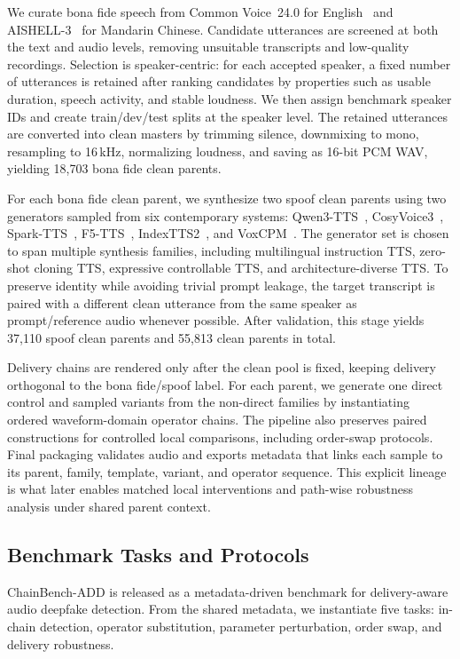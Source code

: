 We curate bona fide speech from Common Voice~24.0 for English~\cite{ardila2020commonvoicemassivelymultilingualspeech} and AISHELL-3~\cite{shi2020aishell} for Mandarin Chinese. Candidate utterances are screened at both the text and audio levels, removing unsuitable transcripts and low-quality recordings. Selection is speaker-centric: for each accepted speaker, a fixed number of utterances is retained after ranking candidates by properties such as usable duration, speech activity, and stable loudness. We then assign benchmark speaker IDs and create train/dev/test splits at the speaker level. The retained utterances are converted into clean masters by trimming silence, downmixing to mono, resampling to 16\,kHz, normalizing loudness, and saving as 16-bit PCM WAV, yielding 18,703 bona fide clean parents.

For each bona fide clean parent, we synthesize two spoof clean parents using two generators sampled from six contemporary systems: Qwen3-TTS~\cite{Qwen3-TTS}, CosyVoice3~\cite{du2025cosyvoice3}, Spark-TTS~\cite{wang2025sparktts}, F5-TTS~\cite{chen-etal-2024-f5tts}, IndexTTS2~\cite{zhou2025indextts2}, and VoxCPM~\cite{voxcpm2025}. The generator set is chosen to span multiple synthesis families, including multilingual instruction TTS, zero-shot cloning TTS, expressive controllable TTS, and architecture-diverse TTS. To preserve identity while avoiding trivial prompt leakage, the target transcript is paired with a different clean utterance from the same speaker as prompt/reference audio whenever possible. After validation, this stage yields 37,110 spoof clean parents and 55,813 clean parents in total.

Delivery chains are rendered only after the clean pool is fixed, keeping delivery orthogonal to the bona fide/spoof label. For each parent, we generate one direct control and sampled variants from the non-direct families by instantiating ordered waveform-domain operator chains. The pipeline also preserves paired constructions for controlled local comparisons, including order-swap protocols. Final packaging validates audio and exports metadata that links each sample to its parent, family, template, variant, and operator sequence. This explicit lineage is what later enables matched local interventions and path-wise robustness analysis under shared parent context.

\subsection{Benchmark Tasks and Protocols}
ChainBench-ADD is released as a metadata-driven benchmark for delivery-aware audio deepfake detection. From the shared metadata, we instantiate five tasks: in-chain detection, operator substitution, parameter perturbation, order swap, and delivery robustness.

